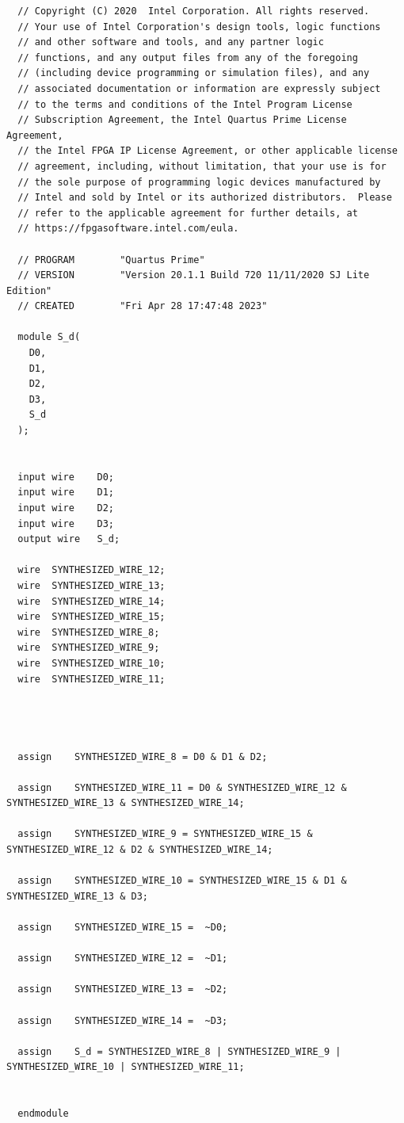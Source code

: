 \documentclass{article}
\begin{document}
\begin{lstlisting}
  // Copyright (C) 2020  Intel Corporation. All rights reserved.
  // Your use of Intel Corporation's design tools, logic functions 
  // and other software and tools, and any partner logic 
  // functions, and any output files from any of the foregoing 
  // (including device programming or simulation files), and any 
  // associated documentation or information are expressly subject 
  // to the terms and conditions of the Intel Program License 
  // Subscription Agreement, the Intel Quartus Prime License Agreement,
  // the Intel FPGA IP License Agreement, or other applicable license
  // agreement, including, without limitation, that your use is for
  // the sole purpose of programming logic devices manufactured by
  // Intel and sold by Intel or its authorized distributors.  Please
  // refer to the applicable agreement for further details, at
  // https://fpgasoftware.intel.com/eula.
  
  // PROGRAM		"Quartus Prime"
  // VERSION		"Version 20.1.1 Build 720 11/11/2020 SJ Lite Edition"
  // CREATED		"Fri Apr 28 17:47:48 2023"
  
  module S_d(
    D0,
    D1,
    D2,
    D3,
    S_d
  );
  
  
  input wire	D0;
  input wire	D1;
  input wire	D2;
  input wire	D3;
  output wire	S_d;
  
  wire	SYNTHESIZED_WIRE_12;
  wire	SYNTHESIZED_WIRE_13;
  wire	SYNTHESIZED_WIRE_14;
  wire	SYNTHESIZED_WIRE_15;
  wire	SYNTHESIZED_WIRE_8;
  wire	SYNTHESIZED_WIRE_9;
  wire	SYNTHESIZED_WIRE_10;
  wire	SYNTHESIZED_WIRE_11;
  
  
  
  
  assign	SYNTHESIZED_WIRE_8 = D0 & D1 & D2;
  
  assign	SYNTHESIZED_WIRE_11 = D0 & SYNTHESIZED_WIRE_12 & SYNTHESIZED_WIRE_13 & SYNTHESIZED_WIRE_14;
  
  assign	SYNTHESIZED_WIRE_9 = SYNTHESIZED_WIRE_15 & SYNTHESIZED_WIRE_12 & D2 & SYNTHESIZED_WIRE_14;
  
  assign	SYNTHESIZED_WIRE_10 = SYNTHESIZED_WIRE_15 & D1 & SYNTHESIZED_WIRE_13 & D3;
  
  assign	SYNTHESIZED_WIRE_15 =  ~D0;
  
  assign	SYNTHESIZED_WIRE_12 =  ~D1;
  
  assign	SYNTHESIZED_WIRE_13 =  ~D2;
  
  assign	SYNTHESIZED_WIRE_14 =  ~D3;
  
  assign	S_d = SYNTHESIZED_WIRE_8 | SYNTHESIZED_WIRE_9 | SYNTHESIZED_WIRE_10 | SYNTHESIZED_WIRE_11;
  
  
  endmodule
  
    
\end{lstlisting}
\end{document}
